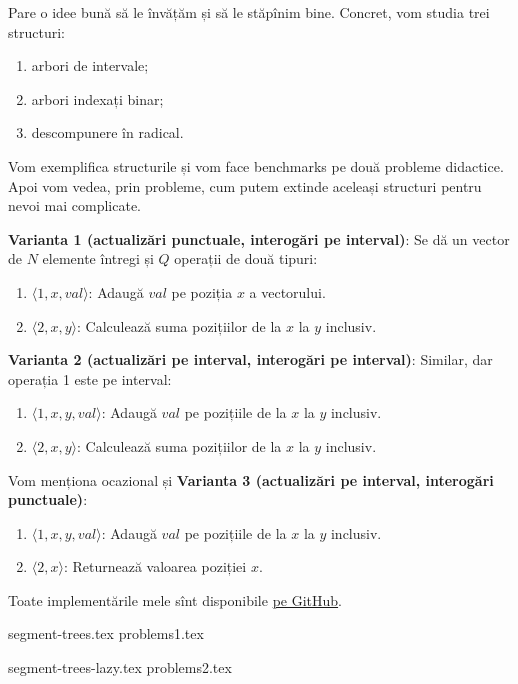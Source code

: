 Pare o idee bună să le învățăm și să le stăpînim bine.  Concret, vom studia trei structuri:

\begin{enumerate}
  \item arbori de intervale;
  \item arbori indexați binar;
  \item descompunere în radical.
\end{enumerate}

Vom exemplifica structurile și vom face benchmarks pe două probleme didactice. Apoi vom vedea, prin probleme, cum putem extinde aceleași structuri pentru nevoi mai complicate.

\textbf{Varianta 1 (actualizări punctuale, interogări pe interval)}: Se dă un vector de $N$ elemente întregi și $Q$ operații de două tipuri:

\begin{enumerate}
  \item $\langle 1, x, val \rangle$: Adaugă $val$ pe poziția $x$ a vectorului.
  \item $\langle 2, x, y \rangle$: Calculează suma pozițiilor de la $x$ la $y$ inclusiv.
\end{enumerate}

\textbf{Varianta 2 (actualizări pe interval, interogări pe interval)}: Similar, dar operația 1 este pe interval:

\begin{enumerate}
  \item $\langle 1, x, y, val \rangle$: Adaugă $val$ pe pozițiile de la $x$ la $y$ inclusiv.
  \item $\langle 2, x, y \rangle$: Calculează suma pozițiilor de la $x$ la $y$ inclusiv.
\end{enumerate}

Vom menționa ocazional și \textbf{Varianta 3 (actualizări pe interval, interogări punctuale)}:

\begin{enumerate}
  \item $\langle 1, x, y, val \rangle$: Adaugă $val$ pe pozițiile de la $x$ la $y$ inclusiv.
  \item $\langle 2, x \rangle$: Returnează valoarea poziției $x$.
\end{enumerate}

Toate implementările mele sînt disponibile \href{https://github.com/CatalinFrancu/nerdvana/tree/main/query-update}{pe GitHub}.

\begin{refsection}
  {segment-trees.tex}
  {problems1.tex}

  \nocite{cpa-segtree}
  \nocite{csa-segtree}
  \printbibliography
\end{refsection}

\begin{refsection}
  {segment-trees-lazy.tex}
  {problems2.tex}
\end{refsection}
